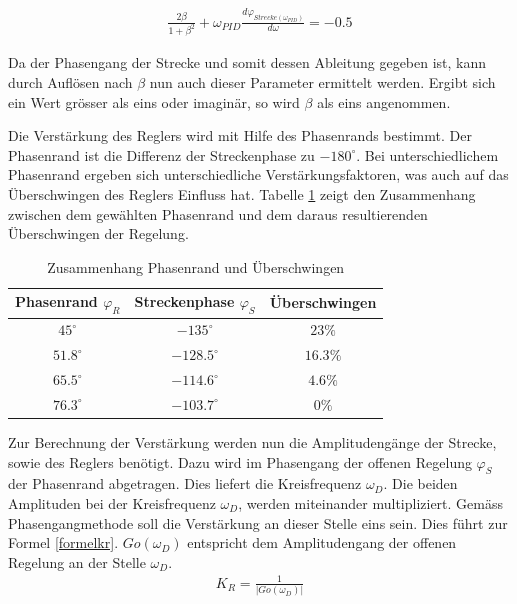 \begin{align}
\frac{2\beta}{1+\beta^2} + \omega_{PID}\frac{d\varphi_{Strecke(\omega_{PID})}}{d\omega} = -0.5
\end{align}\newline

Da der Phasengang der Strecke und somit dessen Ableitung gegeben ist, kann durch Auflösen nach $\beta$ nun auch dieser Parameter ermittelt werden. Ergibt sich ein Wert grösser als eins oder imaginär, so wird $\beta$ als eins angenommen.

Die Verstärkung des Reglers wird mit Hilfe des Phasenrands bestimmt. Der Phasenrand ist die Differenz der Streckenphase zu $-180^\circ$. Bei unterschiedlichem Phasenrand ergeben sich unterschiedliche Verstärkungsfaktoren, was auch auf das Überschwingen des Reglers Einfluss hat. Tabelle \ref{phasenrand} zeigt den Zusammenhang zwischen dem gewählten Phasenrand und dem daraus resultierenden Überschwingen der Regelung.\newline


\begin{table}[h]
\centering
\renewcommand*{\arraystretch}{1.2}
\begin{tabular}{|c|c|c|}
\hline 
\textbf{Phasenrand $\varphi_R$} & \textbf{Streckenphase $\varphi_S$} & \textbf{Überschwingen} \\ 
\hline 
$45^\circ$ & $-135^\circ$ & $23\%$ \\ 
\hline 
$51.8^\circ$ & $-128.5^\circ$ & $16.3\%$ \\ 
\hline 
 $65.5^\circ$& $-114.6^\circ$ & $4.6\%$ \\ 
\hline 
$76.3^\circ$ & $-103.7^\circ$ & $0\%$ \\ 
\hline
\end{tabular} 
\caption{Zusammenhang Phasenrand und Überschwingen}
\label{phasenrand}
\renewcommand*{\arraystretch}{1}
\end{table}


Zur Berechnung der Verstärkung werden nun die Amplitudengänge der Strecke, sowie des Reglers benötigt. Dazu wird im Phasengang der offenen Regelung $\varphi_S$ der Phasenrand abgetragen. Dies liefert die Kreisfrequenz $\omega_D$. Die beiden Amplituden bei der Kreisfrequenz $\omega_D$, werden miteinander multipliziert. Gemäss Phasengangmethode soll die Verstärkung an dieser Stelle eins sein. Dies führt zur Formel \ref{formelkr}. $Go(\omega_D)$ entspricht dem Amplitudengang der offenen Regelung an der Stelle $\omega_D$. \newline
\begin{align}
K_R=\frac{1}{\vert{Go(\omega_D)}\vert{}}
\label{formelkr}
\end{align}

